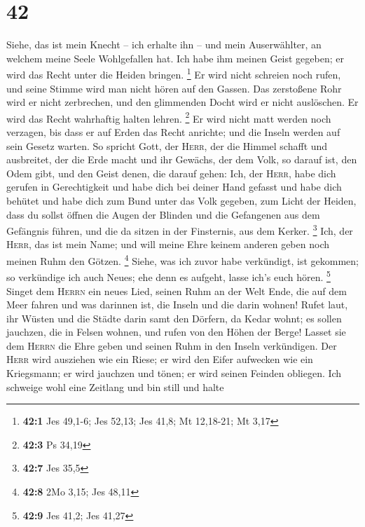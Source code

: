 \hypertarget{section-14}{%
\section{42}\label{section-14}}

 Siehe, das ist mein Knecht -- ich erhalte ihn -- und mein
Auserwählter, an welchem meine Seele Wohlgefallen hat. Ich habe ihm
meinen Geist gegeben; er wird das Recht unter die Heiden bringen.
\footnote{\textbf{42:1} Jes 49,1-6; Jes 52,13; Jes 41,8; Mt 12,18-21; Mt
  3,17}  Er wird nicht schreien noch rufen, und seine
Stimme wird man nicht hören auf den Gassen.  Das
zerstoßene Rohr wird er nicht zerbrechen, und den glimmenden Docht wird
er nicht auslöschen. Er wird das Recht wahrhaftig halten lehren.
\footnote{\textbf{42:3} Ps 34,19}  Er wird nicht matt
werden noch verzagen, bis dass er auf Erden das Recht anrichte; und die
Inseln werden auf sein Gesetz warten.  So spricht Gott,
der \textsc{Herr}, der die Himmel schafft und ausbreitet, der die Erde
macht und ihr Gewächs, der dem Volk, so darauf ist, den Odem gibt, und
den Geist denen, die darauf gehen:  Ich, der
\textsc{Herr}, habe dich gerufen in Gerechtigkeit und habe dich bei
deiner Hand gefasst und habe dich behütet und habe dich zum Bund unter
das Volk gegeben, zum Licht der Heiden,  dass du sollst
öffnen die Augen der Blinden und die Gefangenen aus dem Gefängnis
führen, und die da sitzen in der Finsternis, aus dem Kerker. \footnote{\textbf{42:7}
  Jes 35,5}  Ich, der \textsc{Herr}, das ist mein Name;
und will meine Ehre keinem anderen geben noch meinen Ruhm den Götzen.
\footnote{\textbf{42:8} 2Mo 3,15; Jes 48,11}  Siehe, was
ich zuvor habe verkündigt, ist gekommen; so verkündige ich auch Neues;
ehe denn es aufgeht, lasse ich's euch hören. \footnote{\textbf{42:9} Jes
  41,2; Jes 41,27}  Singet dem \textsc{Herrn} ein neues
Lied, seinen Ruhm an der Welt Ende, die auf dem Meer fahren und was
darinnen ist, die Inseln und die darin wohnen!  Rufet
laut, ihr Wüsten und die Städte darin samt den Dörfern, da Kedar wohnt;
es sollen jauchzen, die in Felsen wohnen, und rufen von den Höhen der
Berge!  Lasset sie dem \textsc{Herrn} die Ehre geben und
seinen Ruhm in den Inseln verkündigen.  Der \textsc{Herr}
wird ausziehen wie ein Riese; er wird den Eifer aufwecken wie ein
Kriegsmann; er wird jauchzen und tönen; er wird seinen Feinden obliegen.
 Ich schweige wohl eine Zeitlang und bin still und halte
